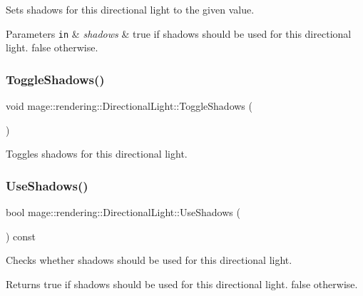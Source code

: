 Sets shadows for this directional light to the given value.


\begin{DoxyParams}[1]{Parameters}
\mbox{\tt in}  & {\em shadows} & {\ttfamily true} if shadows should be used for this directional light. {\ttfamily false} otherwise. \\
\hline
\end{DoxyParams}
\mbox{\label{classmage_1_1rendering_1_1_directional_light_a34a939e192e857ac25f6d91dd773ec9b}} 
\subsubsection{\texorpdfstring{Toggle\+Shadows()}{ToggleShadows()}}
{\footnotesize\ttfamily void mage\+::rendering\+::\+Directional\+Light\+::\+Toggle\+Shadows (\begin{DoxyParamCaption}{ }\end{DoxyParamCaption})\hspace{0.3cm}{\ttfamily [noexcept]}}

Toggles shadows for this directional light. \mbox{\label{classmage_1_1rendering_1_1_directional_light_a129904147256d111ec56cc3ddc502157}} 
\subsubsection{\texorpdfstring{Use\+Shadows()}{UseShadows()}}
{\footnotesize\ttfamily bool mage\+::rendering\+::\+Directional\+Light\+::\+Use\+Shadows (\begin{DoxyParamCaption}{ }\end{DoxyParamCaption}) const\hspace{0.3cm}{\ttfamily [noexcept]}}

Checks whether shadows should be used for this directional light.

\begin{DoxyReturn}{Returns}
{\ttfamily true} if shadows should be used for this directional light. {\ttfamily false} otherwise. 
\end{DoxyReturn}


